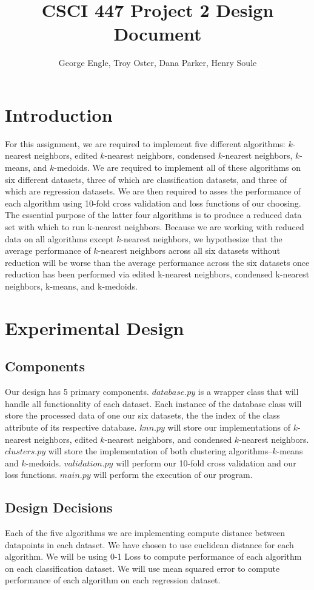 \documentclass{article}
\title{CSCI 447 Project 2 Design Document}
\author{George Engle, Troy Oster, Dana Parker, Henry Soule}
\begin{document}
\maketitle
\section{Introduction}
For this assignment, we are required to implement five different algorithms: $k$-nearest neighbors, edited $k$-nearest neighbors, condensed $k$-nearest neighbors, $k$-means, and $k$-medoids. We are required to implement all of these algorithms on six different datasets, three of which are classification datasets, and three of which are regression datasets. We are then required to asses the performance of each algorithm using 10-fold cross validation and loss functions of our choosing. The essential purpose of the latter four algorithms is to produce a reduced data set with which to run k-nearest neighbors. Because we are working with reduced data on all algorithms except $k$-nearest neighbors, we hypothesize that the average performance of $k$-nearest neighbors across all six datasets without reduction will be worse than the average performance across the six datasets once reduction has been performed via edited k-nearest neighbors, condensed k-nearest neighbors, k-means, and k-medoids.
\section{Experimental Design}
\subsection*{Components}
Our design has 5 primary components. $database.py$ is a wrapper class that will handle all functionality of each dataset. Each instance of the database class will store the processed data of one our six datasets, the the index of the class attribute of its respective database. $knn.py$ will store our implementations of $k$-nearest neighbors, edited $k$-nearest neighbors, and condensed $k$-nearest neighbors. $clusters.py$ will store the implementation of both clustering algorithms--$k$-means and $k$-medoids. $validation.py$ will perform our 10-fold cross validation and our loss functions. $main.py$ will perform the execution of our program. 
\subsection*{Design Decisions}
Each of the five algorithms we are implementing compute distance between datapoints in each dataset. We have chosen to use euclidean distance for each algorithm. We will be using 0-1 Loss to compute performance of each algorithm on each classification dataset. We will use mean squared error to compute performance of each algorithm on each regression dataset. %
\end{document}

